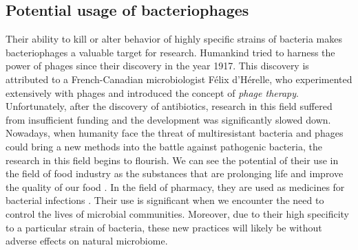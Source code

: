 \subsection{Potential usage of bacteriophages}
Their ability to kill or alter behavior of highly specific strains of bacteria makes bacteriophages a valuable target for research.
Humankind tried to harness the power of phages since their discovery in the year 1917.
This discovery is attributed to a French-Canadian microbiologist Félix d'Hérelle, who experimented extensively with phages and introduced the concept of \emph{phage therapy}\cite{phages_in_nature}.
Unfortunately, after the discovery of antibiotics, research in this field suffered from insufficient funding and the development was significantly slowed down.\\
Nowadays, when humanity face the threat of multiresistant bacteria and phages could bring a new methods into the battle against pathogenic bacteria, the research in this field begins to flourish.
We can see the potential of their use in the field of food industry as the substances that are prolonging life and improve the quality of our food \cite{}.
In the field of pharmacy, they are used as medicines for bacterial infections \cite{}.
Their use is significant when we encounter the need to control the lives of microbial communities.
Moreover, due to their high specificity to a particular strain of bacteria, these new practices will likely be without adverse effects on natural microbiome.


